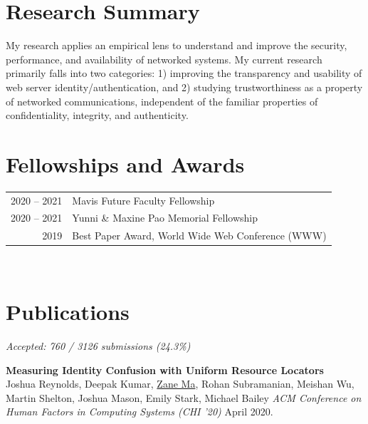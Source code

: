 \documentclass[10pt,singlecolumn]{article} %
\begin{document}
\section{Research Summary} 

My research applies an empirical lens to understand and improve the security,
performance, and availability of networked systems. My current research primarily falls into 
two categories: 1) improving the transparency and usability of web server identity/authentication, and 2) 
studying trustworthiness as a property of networked communications, independent
of the familiar properties of confidentiality, integrity, and authenticity. \\


\section{Fellowships and Awards} 

\begin{tabular}{rl}

2020 -- 2021 & Mavis Future Faculty Fellowship \\

2020 -- 2021 & Yunni \& Maxine Pao Memorial Fellowship \\

2019 & Best Paper Award, World Wide Web Conference (WWW) \\
\end{tabular}\\

\section{Publications} 


\vspace{6pt}

{\raggedleft\textit{Accepted: 760 / 3126 submissions (24.3\%)}\par}

\textbf{Measuring Identity Confusion with Uniform Resource Locators}\\
Joshua Reynolds, Deepak Kumar, \underline{Zane Ma}, Rohan Subramanian, Meishan Wu, Martin Shelton, Joshua Mason, Emily Stark, Michael Bailey
\textit{ACM Conference on Human Factors in Computing Systems (CHI '20)} April 2020.
\end{document}
